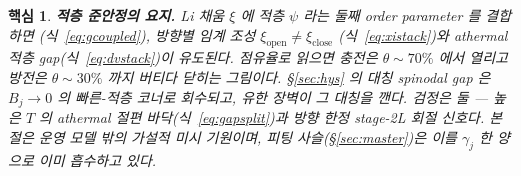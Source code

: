 \documentclass[11pt,a4paper]{article}
\newtheorem*{keybox}{핵심}
\begin{document}
\begin{keybox}
\textbf{적층 준안정의 요지.} Li 채움 $\xi$ 에 적층 $\psi$ 라는 둘째 order parameter 를 결합하면
(식~\eqref{eq:gcoupled}), 방향별 임계 조성 $\xi_{\mathrm{open}}\ne\xi_{\mathrm{close}}$
(식~\eqref{eq:xistack})와 athermal 적층 gap(식~\eqref{eq:dvstack})이 \emph{유도}된다. 점유율로 읽으면
충전은 $\theta\!\sim\!70\%$ 에서 열리고 방전은 $\theta\!\sim\!30\%$ 까지 버티다 닫히는 그림이다.
\S\ref{sec:hys} 의 대칭 spinodal gap 은 $B_j\to0$ 의 빠른-적층 코너로 회수되고, 유한 장벽이 그 대칭을
깬다. 검정은 둘 — 높은 $T$ 의 athermal 절편 바닥(식~\eqref{eq:gapsplit})과 방향 한정 stage-2L 회절
신호다. 본 절은 운영 모델 밖의 \emph{가설적 미시 기원}이며, 피팅 사슬(\S\ref{sec:master})은 이를
$\gamma_j$ 한 양으로 이미 흡수하고 있다.
\end{keybox}
\end{document}
